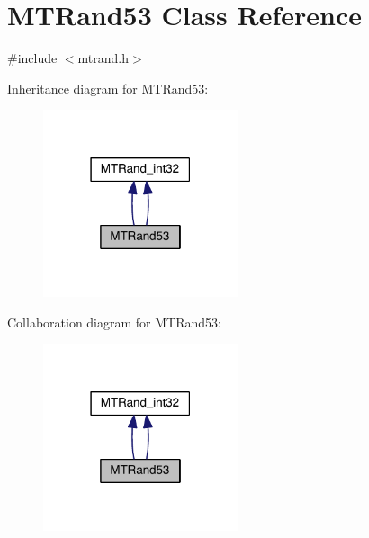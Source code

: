 \hypertarget{a00016}{\section{M\+T\+Rand53 Class Reference}
\label{a00016}
}


{\ttfamily \#include $<$mtrand.\+h$>$}



Inheritance diagram for M\+T\+Rand53\+:\nopagebreak
\begin{figure}[H]
\begin{center}
\leavevmode
\includegraphics[width=162pt]{a00218}
\end{center}
\end{figure}


Collaboration diagram for M\+T\+Rand53\+:\nopagebreak
\begin{figure}[H]
\begin{center}
\leavevmode
\includegraphics[width=162pt]{a00219}
\end{center}
\end{figure}
